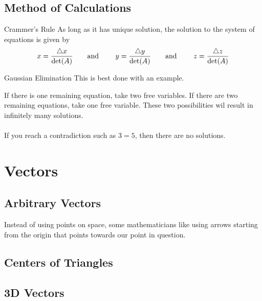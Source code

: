 \documentclass[a4paper]{article}
\begin{document}
\subsection{Method of Calculations}
\begin{prp}{Crammer's Rule}{} As long as it has unique solution, the solution to the system of equations is given by $$x=\frac{\triangle x}{\det(A)}\text{\qquad and \qquad}y=\frac{\triangle y}{\det(A)}\text{\qquad and \qquad}z=\frac{\triangle z}{\det(A)}$$
\end{prp}

\begin{prp}{Gaussian Elimination}{} This is best done with an example. 
\end{prp}
If there is one remaining equation, take two free variables. If there are two remaining equations, take one free variable. These two possibilities wil result in infinitely many solutions. \\~\\
If you reach a contradiction such as $3=5$, then there are no solutions. 

\pagebreak
\section{Vectors}
\subsection{Arbitrary Vectors}
Instead of using points on space, some mathematicians like using arrows starting from the origin that points towards our point in question. 


\subsection{Centers of Triangles}




\subsection{3D Vectors}
\end{document}
